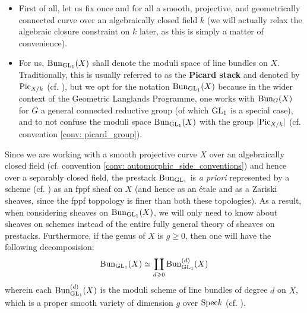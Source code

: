             \begin{convention} \label{conv: automorphic_side_conventions}
                \noindent
                \begin{itemize}
                    \item First of all, let us fix once and for all a smooth, projective, and geometrically connected curve over an algebraically closed field $k$ (we will actually relax the algebraic closure constraint on $k$ later, as this is simply a matter of convenience).
                    \item For us, $\mathrm{Bun}_{\operatorname{GL}_1}(X)$ shall denote the moduli space of line bundles on $X$. Traditionally, this is usually referred to as the \textbf{Picard stack} and denoted by $\mathrm{Pic}_{X/k}$ (cf. \cite[\href{https://stacks.math.columbia.edu/tag/0372}{Tag 0372}]{stacks}), but we opt for the notation $\mathrm{Bun}_{\operatorname{GL}_1}(X)$ because in the wider context of the Geometric Langlands Programme, one works with $\mathrm{Bun}_G(X)$ for $G$ a general connected reductive group (of which $\operatorname{GL}_1$ is a special case), and to not confuse the moduli space $\mathrm{Bun}_{\operatorname{GL}_1}(X)$ with the group $|\mathrm{Pic}_{X/k}|$ (cf. convention \ref{conv: picard_group}). 
                \end{itemize}
            \end{convention}
            \begin{remark} \label{remark: geometry_of_the_picard_stack}
                Since we are working with a smooth projective curve $X$ over an algebraically closed field (cf. convention \ref{conv: automorphic_side_conventions}) and hence over a separably closed field, the prestack $\mathrm{Bun}_{\operatorname{GL}_1}$ is \textit{a priori} represented by a scheme (cf. \cite[\href{https://stacks.math.columbia.edu/tag/0B9Z}{Tag 0B9Z}]{stacks}) as an fppf sheaf on $X$ (and hence as an \'etale and as a Zariski sheaves, since the fppf toppology is finer than both these topologies). As a result, when considering sheaves on $\mathrm{Bun}_{\operatorname{GL}_1}(X)$, we will only need to know about sheaves on schemes instead of the entire fully general theory of sheaves on prestacks. Furthermore, if the genus of $X$ is $g \geq 0$, then one will have the following decomposision:
                    $$\mathrm{Bun}_{\operatorname{GL}_1}(X) \simeq \coprod_{d \geqslant 0} \mathrm{Bun}_{\operatorname{GL}_1}^{(d)}(X)$$
                wherein each $\mathrm{Bun}_{\operatorname{GL}_1}^{(d)}(X)$ is the moduli scheme of line bundles of degree $d$ on $X$, which is a proper smooth variety of dimension $g$ over $\mathrm{Spec} k$ (cf. \cite[\href{https://stacks.math.columbia.edu/tag/0BA0}{Tag 0BA0}]{stacks}).
            \end{remark}
            
